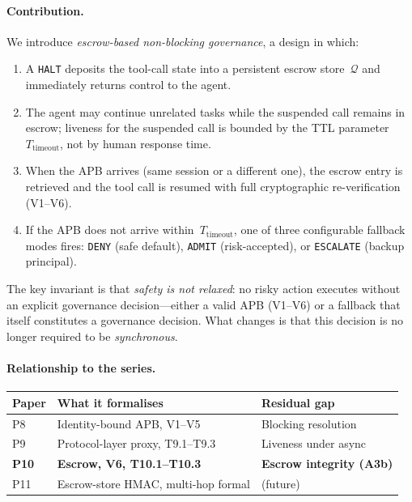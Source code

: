 \documentclass[11pt]{article}
\newcommand{\HALT}{\texttt{HALT}}
\newcommand{\DENY}{\texttt{DENY}}
\newcommand{\ADMIT}{\texttt{ADMIT}}
\newcommand{\ESCALATE}{\texttt{ESCALATE}}
\newcommand{\Ttimeout}{T_{\mathrm{timeout}}}
\newcommand{\Queue}{\mathcal{Q}}
\begin{document}
\paragraph{Contribution.}
We introduce \emph{escrow-based non-blocking governance}, a design
in which:
\begin{enumerate}[leftmargin=*, itemsep=2pt]
  \item A \HALT{} deposits the tool-call state into a persistent escrow
        store~$\Queue$ and immediately returns control to the agent.
  \item The agent may continue unrelated tasks while the suspended call
        remains in escrow; liveness for the suspended call is bounded by
        the TTL parameter~$\Ttimeout$, not by human response time.
  \item When the APB arrives (same session or a different one), the
        escrow entry is retrieved and the tool call is resumed with
        full cryptographic re-verification (V1--V6).
  \item If the APB does not arrive within~$\Ttimeout$, one of three
        configurable fallback modes fires: \DENY{} (safe default),
        \ADMIT{} (risk-accepted), or \ESCALATE{} (backup principal).
\end{enumerate}

The key invariant is that \emph{safety is not relaxed}: no risky
action executes without an explicit governance decision---either a valid
APB (V1--V6) or a fallback that itself constitutes a governance
decision. What changes is that this decision is no longer required to
be \emph{synchronous}.

\paragraph{Relationship to the series.}

\begin{center}
\small
\begin{tabular}{lll}
\toprule
Paper & What it formalises & Residual gap \\
\midrule
P8 & Identity-bound APB, V1--V5 & Blocking resolution \\
P9 & Protocol-layer proxy, T9.1--T9.3 & Liveness under async \\
\textbf{P10} & \textbf{Escrow, V6, T10.1--T10.3} & \textbf{Escrow integrity (A3b)} \\
P11 & Escrow-store HMAC, multi-hop formal & (future) \\
\bottomrule
\end{tabular}
\end{center}
\end{document}
